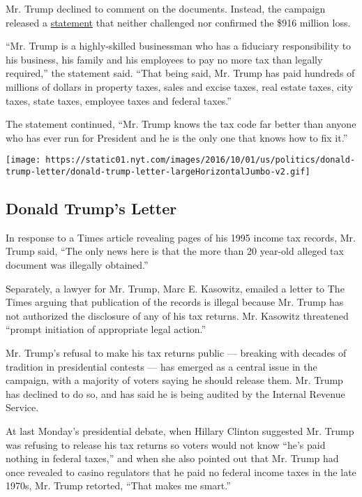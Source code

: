 Mr. Trump declined to comment on the documents. Instead, the campaign
released a
\href{http://www.nytimes.com/interactive/2016/10/01/us/politics/donald-trump-letter.html}{statement}
that neither challenged nor confirmed the \$916 million loss.

``Mr. Trump is a highly-skilled businessman who has a fiduciary
responsibility to his business, his family and his employees to pay no
more tax than legally required,'' the statement said. ``That being said,
Mr. Trump has paid hundreds of millions of dollars in property taxes,
sales and excise taxes, real estate taxes, city taxes, state taxes,
employee taxes and federal taxes.''

The statement continued, ``Mr. Trump knows the tax code far better than
anyone who has ever run for President and he is the only one that knows
how to fix it.''

\href{https://www.nytimes.com/interactive/2016/10/01/us/politics/donald-trump-letter.html}{}

\texttt{[image: https://static01.nyt.com/images/2016/10/01/us/politics/donald-trump-letter/donald-trump-letter-largeHorizontalJumbo-v2.gif]}

\hypertarget{donald-trumps-letter}{%
\subsection{Donald Trump's Letter}\label{donald-trumps-letter}}

In response to a Times article revealing pages of his 1995 income tax
records, Mr. Trump said, ``The only news here is that the more than 20
year-old alleged tax document was illegally obtained.''

Separately, a lawyer for Mr. Trump, Marc E. Kasowitz, emailed a letter
to The Times arguing that publication of the records is illegal because
Mr. Trump has not authorized the disclosure of any of his tax returns.
Mr. Kasowitz threatened ``prompt initiation of appropriate legal
action.''

Mr. Trump's refusal to make his tax returns public --- breaking with
decades of tradition in presidential contests --- has emerged as a
central issue in the campaign, with a majority of voters saying he
should release them. Mr. Trump has declined to do so, and has said he is
being audited by the Internal Revenue Service.

At last Monday's presidential debate, when Hillary Clinton suggested Mr.
Trump was refusing to release his tax returns so voters would not know
``he's paid nothing in federal taxes,'' and when she also pointed out
that Mr. Trump had once revealed to casino regulators that he paid no
federal income taxes in the late 1970s, Mr. Trump retorted, ``That makes
me smart.''

